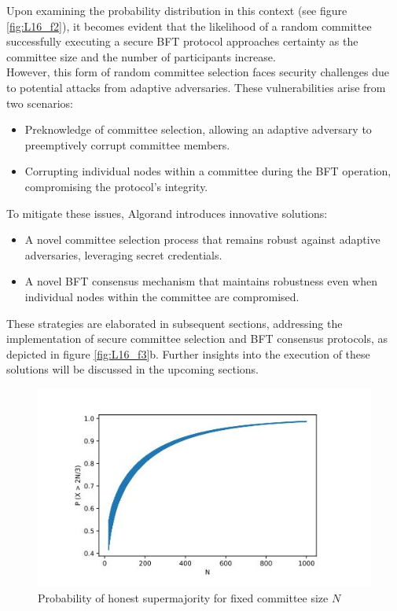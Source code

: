 Upon examining the probability distribution in this context (see figure \ref{fig:L16_f2}), it becomes evident that the likelihood of a random committee successfully executing a secure BFT protocol approaches certainty as the committee size and the number of participants increase.\\
However, this form of random committee selection faces security challenges due to potential attacks from adaptive adversaries. These vulnerabilities arise from two scenarios: 
\begin{itemize}
	\item Preknowledge of committee selection, allowing an adaptive adversary to preemptively corrupt committee members.
	\item Corrupting individual nodes within a committee during the BFT operation, compromising the protocol's integrity.
\end{itemize}
To mitigate these issues, Algorand introduces innovative solutions: 
\begin{itemize}
	\item A novel committee selection process that remains robust against adaptive adversaries, leveraging secret credentials.
	\item A novel BFT consensus mechanism that maintains robustness even when individual nodes within the committee are compromised.
\end{itemize}
These strategies are elaborated in subsequent sections, addressing the implementation of secure committee selection and BFT consensus protocols, as depicted in figure \ref{fig:L16_f3}b. Further insights into the execution of these solutions will be discussed in the upcoming sections.
\begin{center}
	\begin{figure}
		\centering
		\includegraphics[width=0.8\linewidth]{Fig/16/F1}
		\caption{Probability of honest supermajority for fixed committee size $N$}
		\label{fig:f1}
	\end{figure}
\end{center}
